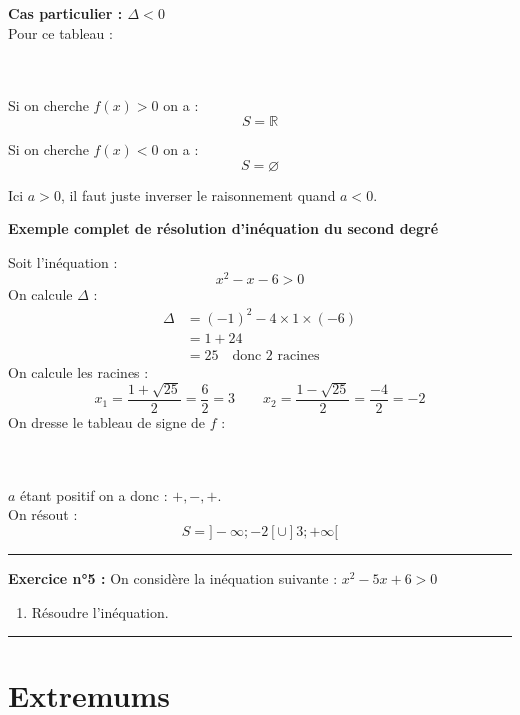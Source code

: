 \documentclass{article}
\begin{document}
	\textbf{Cas particulier : $\Delta < 0$}\\
	Pour ce tableau : \\\\
	\\
	
	\noindent Si on cherche $f(x) > 0$ on a :
	\[
	S = \mathbb{R}
	\]
	
	\noindent Si on cherche $f(x) < 0$ on a :
	\[
	S = \varnothing
	\]
	
	\noindent Ici $a > 0$, il faut juste inverser le raisonnement quand $a < 0$.\\
	
	\newpage
	
	\textbf{Exemple complet de résolution d'inéquation du second degré}
	
	\noindent Soit l'inéquation : 
	\[
	x^2 - x - 6 > 0
	\]
	On calcule $\Delta$ :
	\begin{align*}
		\Delta &= (-1)^2 - 4\times1\times(-6)  \\
		&= 1 + 24 \\
		&= 25 \quad \text{donc 2 racines}
	\end{align*}
	On calcule les racines :
	\[
	x_1 = \frac{1 + \sqrt{25}}{2} = \frac{6}{2} = 3 \quad \quad x_2 = \frac{1 - \sqrt{25}}{2} = \frac{-4}{2} = -2
	\]
	On dresse le tableau de signe de $f$ : \\\\
	\\
	$a$ étant positif on a donc : $+, -, +$.\\
	
	\noindent On résout :
	\[
	S = ]-\infty;-2[ \cup ]3;+\infty[
	\]
	
	\rule{\textwidth}{0.4pt}
	\noindent \textbf{Exercice n°5 :}
	On considère la inéquation suivante : $x^2 - 5x + 6 > 0$
	\begin{enumerate}
	\item Résoudre l'inéquation.
	\end{enumerate}
	
	\rule{\textwidth}{0.4pt}
	\newpage
	\section{Extremums}
\end{document}
